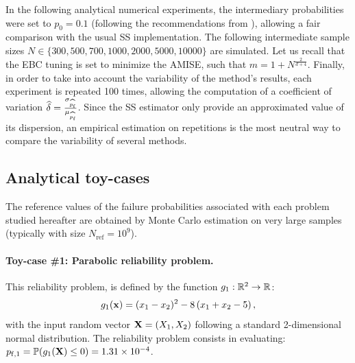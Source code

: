 In the following analytical numerical experiments, the intermediary probabilities were set to $p_0=0.1$ (following the recommendations from \citealp{AuBeck2001}), allowing a fair comparison with the usual SS implementation. 
The following intermediate sample sizes $N \in \{300, 500, 700, 1000, 2000, 5000, 10000\}$ are simulated.
Let us recall that the EBC tuning is set to minimize the AMISE, such that $m = 1 + N^{\frac{2}{d+4}}$. 
Finally, in order to take into account the variability of the method's results, each experiment is repeated 100 times, allowing the computation of a coefficient of variation $\widehat{\delta} = \frac{\sigma_{\widehat{p_\mathrm{f}}}}{\mu_{\widehat{p_\mathrm{f}}}}$. 
Since the SS estimator only provide an approximated value of its dispersion, an empirical estimation on repetitions is the most neutral way to compare the variability of several methods. 


\subsection{Analytical toy-cases}\label{sec:testcases}
The reference values of the failure probabilities associated with each problem studied hereafter are obtained by Monte Carlo estimation on very large samples (typically with size $N_{\mathrm{ref}} = 10^9$). 

\paragraph{Toy-case \#1: Parabolic reliability problem.}
This reliability problem, is defined by the function $g_1: \mathbb{R}^2 \rightarrow \mathbb{R}$:
\begin{equation}
    g_1({\bf x})= (x_1 - x_2) ^ 2 - 8 \, (x_1 + x_2 - 5)\, ,
\end{equation}
with the input random vector ${\bf X} = (X_1, X_2)$ following a standard 2-dimensional normal distribution. 
The reliability problem consists in evaluating: $p_{\mathrm{f}, 1} = \mathbb{P} ( g_1({\bf X}) \leq 0 ) = 1.31 \times 10^{-4}$.

